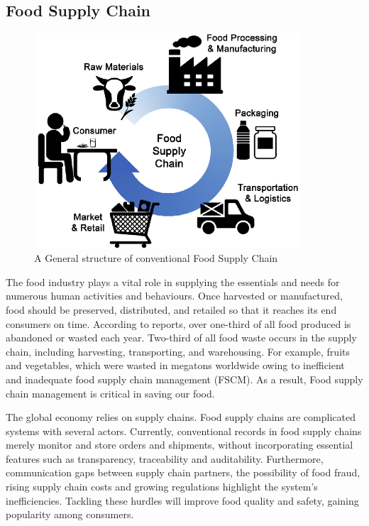 \documentclass[12pt,a4paper,twocolumn,fleqn]{article}
\begin{document}
\subsection{Food Supply Chain}
\begin{figure} [H]
\includegraphics[width=10cm,height=8cm]{media/Food Supply Chain GS.png}
\centering
\caption{A General structure of conventional Food Supply Chain}
\end{figure}
The food industry plays a vital role in supplying the essentials and needs for numerous human activities and behaviours. Once harvested or manufactured, food should be preserved, distributed, and retailed so that it reaches its end consumers on time. According to reports, over one-third of all food produced is abandoned or wasted each year. Two-third of all food waste occurs in the supply chain, including harvesting, transporting, and warehousing. For example, fruits and vegetables, which were wasted in megatons worldwide owing to inefficient and inadequate food supply chain management (FSCM). As a result, Food supply chain management is critical in saving our food. 

The global economy relies on supply chains. Food supply chains are complicated systems with several actors. Currently, conventional records in food supply chains merely monitor and store orders and shipments, without incorporating essential features such as transparency, traceability and auditability. Furthermore, communication gaps between supply chain partners, the possibility of food fraud, rising supply chain costs and growing regulations highlight the system's inefficiencies. Tackling these hurdles will improve food quality and safety, gaining popularity among consumers. 
\end{document}

